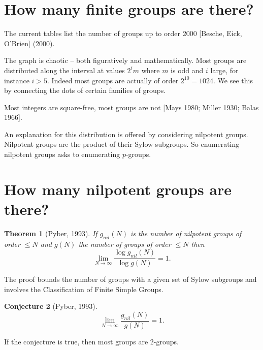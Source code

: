 \documentclass[12pt]{article}
\newtheorem{thm}{Theorem}
\newtheorem{conj}[thm]{Conjecture}
\begin{document}
\section{How many finite groups are there?}

The current tables list the number of groups up to order 2000 [Besche, Eick, O'Brien] (2000).

\begin{center}

\end{center}


The graph is chaotic -- both figuratively and mathematically.
Most groups are distributed along the interval at values $2^i m$ where $m$ is odd and $i$ large, for instance $i>5$.  Indeed most groups are actually of order $2^{10}=1024$.  We see this by connecting the dots of certain families of groups.
\begin{center}

\end{center}

Most integers are square-free, most groups are not [Mays 1980; Miller 1930; 
Balas 1966].

An explanation for this distribution is offered by considering nilpotent groups.
Nilpotent groups are the product of their Sylow subgroups.  So enumerating
nilpotent groups asks to enumerating $p$-groups.  

\section{How many nilpotent groups are there?}

\begin{center}

\end{center}

\begin{thm}[Pyber, 1993]
If $g_{nil}(N)$ is the number of nilpotent groups of order $\leq N$ and $g(N)$ the number
of groups of order $\leq N$ then 
\[\lim_{N\rightarrow \infty} \frac{\log g_{nil}(N)}{\log g(N)}=1.\]
\end{thm}
The proof bounds the number of groups with a given set of Sylow subgroups and involves
the Classification of Finite Simple Groups.


\begin{conj}[Pyber, 1993]
\[\lim_{N\rightarrow \infty} \frac{g_{nil}(N)}{g(N)}=1.\]
\end{conj}

If the conjecture is true, then most groups are 2-groups.
\end{document}
